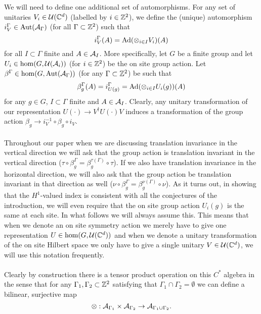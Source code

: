 \documentclass[11pt,a4paper,twoside]{article}
\numberwithin{equation}{section}
\begin{document}
We will need to define one additional set of automorphisms. For any set of unitaries $V_i\in\UU(\CC^d)$ (labelled by $i\in\ZZ^2$), we define the (unique) automorphism $i_V^\Gamma\in\Aut{\AA_\Gamma}$ (for all $\Gamma\subset \ZZ^2$) such that
\begin{equation}
i_V^\Gamma (A)=\Ad{\otimes_{i\in I} V_i}(A)
\end{equation}
for all $I\subset\Gamma$ finite and $A\in\AA_I$. More specifically, let $G$ be a finite group and let $U_i\in\hom(G,\UU(\AA_i))$ (for $i\in\ZZ^2$) be the on site group action. Let $\beta^\Gamma\in\hom(G,\Aut{\AA_\Gamma})$ (for any $\Gamma\subset\ZZ^2$) be such that
\begin{equation}
\beta^\Gamma_g(A)=i_{U(g)}^\Gamma=\Ad{\otimes_{i\in I} U_i(g)}(A)
\end{equation}
for any $g\in G$, $I\subset\Gamma$ finite and $A\in\AA_I$. Clearly, any unitary transformation of our representation $U(\cdot)\rightarrow V^\dagger U(\cdot) V$ induces a transformation of the group action $\beta_g\rightarrow i_{V}^{-1}\circ\beta_g\circ i_V$.\\\\
Throughout our paper when we are discussing translation invariance in the vertical direction we will ask that the group action is translation invariant in the vertical direction ($\tau\circ\beta_g^\Gamma=\beta_g^{\tau(\Gamma)}\circ\tau$). If we also have translation invariance in the horizontal direction, we will also ask that the group action be translation invariant in that direction as well ($\nu\circ\beta_g^\Gamma=\beta_g^{\nu(\Gamma)}\circ\nu$). As it turns out, in showing that the $H^1$-valued index is consistent with all the conjectures of the introduction, we will even require that the on site group action $U_i(g)$ is the same at each site. In what follows we will always assume this. This means that when we denote an on site symmetry action we merely have to give one representation $U\in\hom(G,\UU(\CC^d))$ and when we denote a unitary transformation of the on site Hilbert space we only have to give a single unitary $V\in \UU(\CC^d)$, we will use this notation frequently.\\\\
Clearly by construction there is a tensor product operation on this $C^*$ algebra in the sense that for any $\Gamma_1,\Gamma_2\subset\ZZ^2$ satisfying that $\Gamma_1\cap\Gamma_2=\emptyset$ we can define a bilinear, surjective map
\begin{equation}
\otimes:\AA_{\Gamma_1}\times\AA_{\Gamma_2}\rightarrow \AA_{\Gamma_1\cup\Gamma_2}.
\end{equation}
\end{document}
